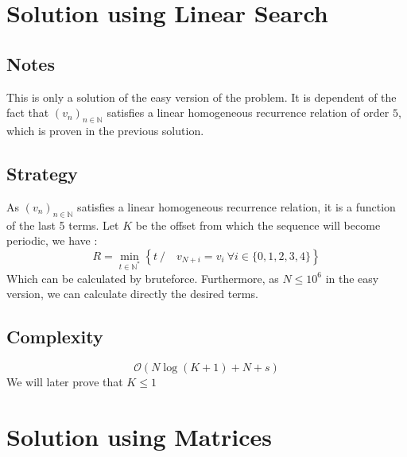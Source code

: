 \documentclass[]{article}
\begin{document}
\section{Solution using Linear Search}
\subsection{Notes}
This is only a solution of the easy version of the problem.
\newline
It is dependent of the fact that $(v_n)_{n\in\mathbb{N}}$ satisfies a linear homogeneous recurrence relation of order $5$, which is proven in the previous solution.
\subsection{Strategy}
As $(v_n)_{n\in\mathbb{N}}$ satisfies a linear homogeneous recurrence relation, it is a function of the last 5 terms.
\newline 
Let $K$ be the offset from which the sequence will become periodic, we have :
$$\boxed{R = \min_{t\in\mathbb{N}^*}\left\{t \ / \quad v_{N+i}=v_i \ \forall i \in \{0,1,2,3,4\}\right\} }$$
Which can be calculated by bruteforce.
\newline
Furthermore, as $N\leq 10^6$ in the easy version, we can calculate directly the desired terms.
\subsection{Complexity}
$$
\mathcal{O}(N\log(K+1)+N+s )
$$
We will later prove that $K\leq 1$
\pagebreak
\section{Solution using Matrices}
\end{document}
